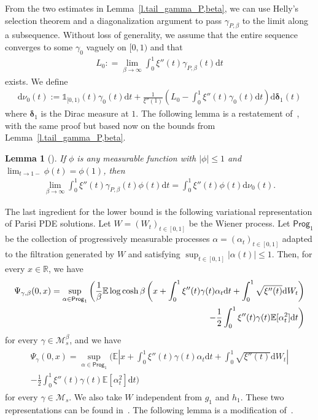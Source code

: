 \documentclass[11pt]{amsart}
\newtheorem{lemma}[proposition]{Lemma}
\theoremstyle{remark}
\theoremstyle{definition}
\numberwithin{equation}{section}
\numberwithin{proposition}{section}
\numberwithin{figure}{section}
\numberwithin{table}{section}
\newcommand{\R}{\mathbb{R}}
\newcommand{\E}{\mathbb{E}}
\renewcommand{\leq}{\leqslant}
\newcommand{\Ll}{\left}
\newcommand{\Rr}{\right}
\renewcommand{\d}{\mathrm{d}}
\newcommand{\1}{\mathbf{1}}
\newcommand{\prog}{\mathsf{Prog}}
\newcommand{\cM}{\mathcal{M}}
\begin{document}
From the two estimates in Lemma~\ref{l.tail_gamma_P,beta}, we can use Helly's selection theorem and a diagonalization argument to pass $\gamma_{P,\beta}$ to the limit along a subsequence. Without loss of generality, we assume that the entire sequence converges to some $\gamma_0$ vaguely on $[0,1)$ and that 
\begin{align}\label{e.L_0=}
    L_0 : = \lim_{\beta\to\infty}\int_0^1\xi''(t)\gamma_{P,\beta}(t)\d t
\end{align}
exists. 
We define
\begin{align}\label{e.nu_0=}
    \d \nu_0(t):=\mathds{1}_{[0,1)}(t)\gamma_0(t)\d t + \frac{1}{\xi''(1)}\Ll(L_0 - \int_0^1\xi''(t)\gamma_0(t)\d t\Rr)\d\boldsymbol{\delta}_1( t)
\end{align}
where $\boldsymbol{\delta}_1$ is the Dirac measure at $1$. 
The following lemma is a restatement of~\cite[Lemma~1]{auffinger2017parisi}, with the same proof but based now on the bounds from Lemma~\ref{l.tail_gamma_P,beta}.

\begin{lemma}[\cite{auffinger2017parisi}]
If $\phi$ is any measurable function with $|\phi|\leq 1$ and $\lim_{t\to 1-}\phi(t) = \phi(1)$, then
\begin{align}\label{e.int..phi->int..phidnu}
    \lim_{\beta\to\infty}\int_0^1\xi''(t)\gamma_{P,\beta}(t)\phi(t)\d t= \int_0^1\xi''(t)\phi(t)\d \nu_0(t).
\end{align}
\end{lemma}

The last ingredient for the lower bound is the following variational representation of Parisi PDE solutions. 
Let $W=(W_t)_{t\in[0,1]}$ be the Wiener process. Let $\prog_1$ be the collection of progressively measurable processes $\alpha=(\alpha_t)_{t\in[0,1]}$ adapted to the filtration generated by $W$ and satisfying $\sup_{t\in[0,1]}|\alpha(t)|\leq1$. Then, for every $x\in\R$, we have
\begin{align}
    \Psi_{\gamma,\beta}(0,x) = \sup_{\alpha\in\prog_1}\bigg(\frac{1}{\beta}\E\log\cosh \beta\Ll( x + \int_0^1\xi''(t)\gamma(t)\alpha_t\d t +\int_0^1\sqrt{\xi''(t)}\d W_t\Rr)\notag
    \\
    -\frac{1}{2}\int_0^1 \xi''(t)\gamma(t)\E[\alpha^2_t]\d t\bigg) \label{e.AC_rep_1}
\end{align}
for every $\gamma \in \cM^\beta_s$, and we have
\begin{align}\label{e.AC_rep_2}
\begin{split}
    \Psi_{\gamma}(0,x) = \sup_{\alpha\in\prog_1}\bigg(\E\Ll| x + \int_0^1\xi''(t)\gamma(t)\alpha_t\d t +\int_0^1\sqrt{\xi''(t)}\d W_t\Rr|
    \\
    -\frac{1}{2}\int_0^1 \xi''(t)\gamma(t)\E[\alpha^2_t]\d t\bigg)
\end{split}
\end{align}
for every $\gamma \in \cM_s$. 
We also take $W$ independent from $g_1$ and $h_1$.
These two representations can be found in~\cite[Corollaries~1 and 2]{auffinger2017parisi}. The following lemma is a modification of~\cite[Lemma~3]{auffinger2017parisi}.
\end{document}
